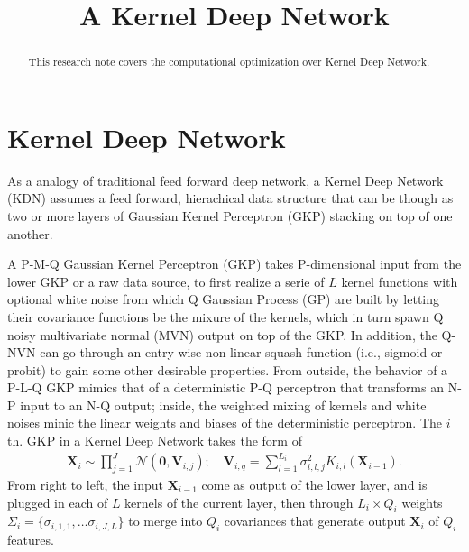 \documentclass[11pt]{article}
\newcommand{\bs}{\boldsymbol}
\newcommand{\xv}{\boldsymbol{V}}
\newcommand{\xx}{\boldsymbol{X}}
\begin{document}
\title{A Kernel Deep Network}
\maketitle
{}

\clearpage
\begin{abstract}
  This research note covers the computational optimization over Kernel Deep Network.
\end{abstract}
\clearpage

\section{Kernel Deep Network}
As a analogy of traditional feed forward deep network, a Kernel Deep Network (KDN) assumes a feed forward, hierachical data structure that can be though as two or more layers of Gaussian Kernel Perceptron (GKP) stacking on top of one another.

A P-M-Q Gaussian Kernel Perceptron (GKP) takes P-dimensional input from the lower GKP or a raw data source, to first realize a serie of $L$ kernel functions with optional white noise from which Q Gaussian Process (GP) are built by letting their covariance functions be the mixure of the kernels, which in turn spawn Q noisy multivariate normal (MVN) output on top of the GKP. In addition, the Q-NVN can go through an entry-wise non-linear squash function (i.e., sigmoid or probit) to gain some other desirable properties. From outside, the behavior of a P-L-Q GKP mimics that of a deterministic P-Q perceptron that transforms an N-P input to an N-Q output; inside, the weighted mixing of kernels and white noises minic the linear weights and biases of the deterministic perceptron. The $i$ th. GKP in a Kernel Deep Network takes the form of
\begin{align}\label{gkp}
  \xx_i \sim \prod_{j=1}^J \mathcal{N}(\bs{0}, \xv_{i,j}); \quad \xv_{i,q} = \sum_{l=1}^{L_i} \sigma_{i,l,j}^2 K_{i,l}(\xx_{i-1}).
\end{align}
From right to left, the input $\xx_{i-1}$ come as output of the lower layer, and is plugged in each of $L$ kernels of the current layer, then through $L_i \times Q_i$ weights $\Sigma_i=\{\sigma_{i,1,1}, \dots \sigma_{i,J,L} \}$ to merge into $Q_i$ covariances that generate output $\xx_i$ of $Q_i$ features.
\end{document}
